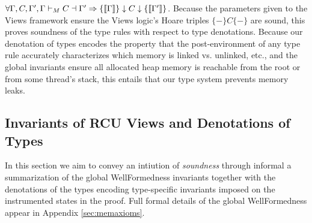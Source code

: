 $
    \forall \Gamma,C,\Gamma', \Gamma\vdash_M C \dashv \Gamma' \Rightarrow \{\llbracket\Gamma\rrbracket\}\downarrow C\downarrow\{\llbracket\Gamma'\rrbracket\}
$.
Because the parameters given to the Views framework ensure the Views logic's Hoare triples $\{-\}C\{-\}$ are sound, this proves soundness of the type rules with respect to type denotations.
Because our denotation of types encodes the property that the post-environment of any type rule accurately characterizes which memory is linked vs. unlinked, etc., and the global invariants ensure all allocated heap memory is reachable from the root or from some thread's stack, this entails that our type system prevents memory leaks.

\subsection{Invariants of RCU Views and Denotations of Types}
\label{sec:lemmas}
In this section we aim to convey an intiution of \textit{soundness} through informal a summarization of the global \textsf{WellFormed}ness invariants together with the denotations of the types encoding type-specific invariants imposed on the instrumented states in the proof. Full formal details of the global \textsf{WellFormed}ness appear in Appendix \ref{sec:memaxioms}.


